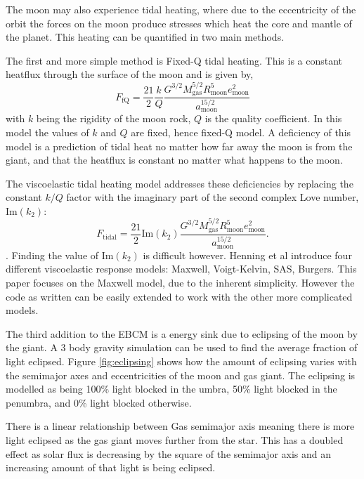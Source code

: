 \documentclass[12pt, onecolumn]{revtex4-2}    %
\begin{document}
The moon may also experience tidal heating, where due to the eccentricity of the orbit the forces on the moon produce stresses which heat the core and mantle of the planet.
This heating can be quantified in two main methods.

The first and more simple method is Fixed-Q tidal heating.
This is a constant heatflux through the surface of the moon and is given by,
\begin{equation}
    F_{\text{fQ}} = \frac{21}{2} \frac{k}{Q} \frac{G^{3/2}M_{\text{gas}}^{5/2}R_{\text{moon}}^5 e_{\text{moon}}^2} {a_{\text{moon}}^{15/2}}
\end{equation}
with $k$ being the rigidity of the moon rock, $Q$ is the quality coefficient.
In this model the values of $k$ and $Q$ are fixed, hence fixed-Q model.
A deficiency of this model is a prediction of tidal heat no matter how far away the moon is from the giant, and that the heatflux is constant no matter what happens to the moon.

The viscoelastic tidal heating model addresses these deficiencies by replacing the constant $k/Q$ factor with the imaginary part of the second complex Love number, $\text{Im}(k_2)$:
\begin{equation}
    F_{\text{tidal}} = \frac{21}{2} \text{Im}(k_2) \frac{G^{3/2}M_{\text{gas}}^{5/2}R_{\text{moon}}^5 e_{\text{moon}}^2} {a_{\text{moon}}^{15/2}}.
\end{equation} \cite{YP1981} \cite{Segatz1988} \cite{DHT2015}.
Finding the value of $\text{Im}(k_2)$ is difficult however.
Henning et al \cite{Henning2009} introduce four different viscoelastic response models: Maxwell, Voigt-Kelvin, SAS, Burgers.
This paper focuses on the Maxwell model, due to the inherent simplicity.
However the code as written can be easily extended to work with the other more complicated models.

The third addition to the EBCM is a energy sink due to eclipsing of the moon by the giant.
A 3 body gravity simulation can be used to find the average fraction of light eclipsed.
Figure \ref{fig:eclipsing} shows how the amount of eclipsing varies with the semimajor axes and eccentricities of the moon and gas giant.
The eclipsing is modelled as being 100\% light blocked in the umbra, 50\% light blocked in the penumbra, and 0\% light blocked otherwise.

There is a linear relationship between Gas semimajor axis meaning there is more light eclipsed as the gas giant moves further from the star.
This has a doubled effect as solar flux is decreasing by the square of the semimajor axis and an increasing amount of that light is being eclipsed.
\end{document}
